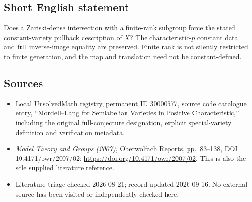 \documentclass[11pt]{article}
\begin{document}
\subsection{Short English statement}
Does a Zariski-dense intersection with a finite-rank subgroup force the stated constant-variety pullback description of \(X\)? The characteristic-\(p\) constant data and full inverse-image equality are preserved. Finite rank is not silently restricted to finite generation, and the map and translation need not be constant-defined.
\subsection{Sources}
\begin{itemize}
\item Local UnsolvedMath registry, permanent ID 30000677, source code catalogue entry, ``Mordell--Lang for Semiabelian Varieties in Positive Characteristic,'' including the original full-conjecture designation, explicit special-variety definition and verification metadata.
\item \emph{Model Theory and Groups (2007)}, Oberwolfach Reports, pp.\ 83--138, DOI 10.4171/owr/2007/02: \url{https://doi.org/10.4171/owr/2007/02}. This is also the sole supplied literature reference.
\item Literature triage checked 2026-08-21; record updated 2026-09-16. No external source has been visited or independently checked here.
\end{itemize}
\end{document}
